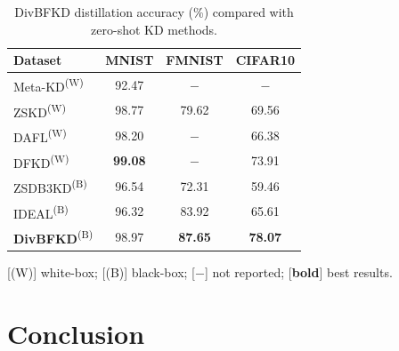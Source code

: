 \documentclass[12pt, a4paper, twoside]{book}
\numberwithin{equation}{chapter}
\theoremstyle{plain}
\theoremstyle{definition}
\theoremstyle{remark}
\newcommand{\whitebox}{\textsuperscript{(W)}}
\newcommand{\blackbox}{\textsuperscript{(B)}}
\begin{document}
\begin{table}[ht]
  \centering
  \begin{threeparttable}
    \caption[DivBFKD accuracy compared with zero-shot KD methods.]{
      DivBFKD distillation accuracy (\%) compared with zero-shot KD methods.
    }
    \label{tab:04-experiments-comparison_data_free}
    \begin{tabular}{l|c|c|c}
      \hline
      \textbf{Dataset} & \textbf{MNIST} & \textbf{FMNIST} & \textbf{CIFAR10}  \\
      \hline
      Meta-KD\whitebox          & 92.47          & $-$            & $-$ \\
      ZSKD\whitebox             & 98.77          & 79.62          & 69.56 \\
      DAFL\whitebox             & 98.20          & $-$            & 66.38 \\
      DFKD\whitebox             & \textbf{99.08} & $-$            & 73.91 \\
      ZSDB3KD\blackbox          & 96.54          & 72.31          & 59.46 \\
      IDEAL\blackbox            & 96.32          & 83.92          & 65.61 \\
      \textbf{DivBFKD}\blackbox & 98.97          & \textbf{87.65} & \textbf{78.07} \\
      \hline
    \end{tabular}
    \begin{tablenotes}[flushleft] \footnotesize
    \item {[(W)] white-box; [(B)] black-box; [$-$] not reported; [\textbf{bold}] best results.}
    \end{tablenotes}
  \end{threeparttable}
\end{table}
 \section{Conclusion} \label{sec:34-research01-conclusion}
\end{document}
